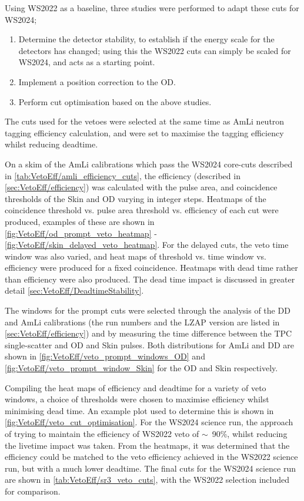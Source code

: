 Using WS2022 as a baseline, three studies were performed to adapt these cuts for WS2024;
\begin{enumerate}
	\item Determine the detector stability, to establish if the energy scale for the detectors has changed; using this the WS2022 cuts can simply be scaled for WS2024, and acts as a starting point.
	\item Implement a position correction to the OD.
	\item Perform cut optimisation based on the above studies.
\end{enumerate}
The cuts used for the vetoes were selected at the same time as AmLi neutron tagging efficiency calculation, and were set to maximise the tagging efficiency whilst reducing deadtime.

On a skim of the AmLi calibrations which pass the WS2024 core-cuts described in \autoref{tab:VetoEff/amli_efficiency_cuts}, the efficiency (described in \autoref{sec:VetoEff/efficiency}) was calculated with the pulse area, and coincidence thresholds of the Skin and OD varying in integer steps.
Heatmaps of the coincidence threshold vs. pulse area threshold vs. efficiency of each cut were produced, examples of these are shown in \autoref{fig:VetoEff/od_prompt_veto_heatmap} - \ref{fig:VetoEff/skin_delayed_veto_heatmap}.
For the delayed cuts, the veto time window was also varied, and heat maps of threshold vs. time window vs. efficiency were produced for a fixed coincidence. Heatmaps with dead time rather than efficiency were also produced. The dead time impact is discussed in greater detail \autoref{sec:VetoEff/DeadtimeStability}.

The windows for the prompt cuts were selected through the analysis of the DD and AmLi calibrations (the run numbers and the LZAP version are listed in \autoref{sec:VetoEff/efficiency}) and by measuring the time difference between the TPC single-scatter and OD and Skin pulses.
Both distributions for AmLi and DD are shown in \autoref{fig:VetoEff/veto_prompt_windows_OD} and \autoref{fig:VetoEff/veto_prompt_window_Skin} for the OD and Skin respectively.

Compiling the heat maps of efficiency and deadtime for a variety of veto windows, a choice of thresholds were chosen to maximise efficiency whilst minimising dead time. An example plot used to determine this is shown in \autoref{fig:VetoEff/veto_cut_optimisation}.
For the WS2024 science run, the approach of trying to maintain the efficiency of WS2022 veto of $\sim$~90\%, whilst reducing the livetime impact was taken.
From the heatmaps, it was determined that the efficiency could be matched to the veto efficiency achieved in the WS2022 science run, but with a much lower deadtime.
The final cuts for the WS2024 science run are shown in \autoref{tab:VetoEff/sr3_veto_cuts}, with the WS2022 selection included for comparison.

